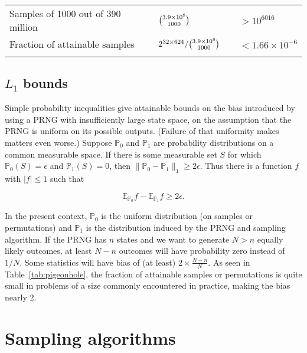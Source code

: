 \documentclass[graybox]{svmult}
\begin{document}
\begin{table}
\begin{tabular}[h]{p{4.7cm}p{2.4cm}p{3.9cm}p{2cm}}
Samples of 1000 out of 390 million & $\tbinom{3.9\times 10^8}{1000}$ & & $> 10^{6016}$ \\
Fraction of attainable samples & ${2^{32 \times 624}}/{\tbinom{3.9\times 10^8}{1000}}$ &  & $< 1.66 \times 10^{-6}$ \\
\noalign{\smallskip}\svhline\noalign{\smallskip}
\end{tabular}
\end{table}

\subsection{$L_1$ bounds}\label{sec:L1bounds}

Simple probability inequalities give attainable bounds on the bias introduced by using a 
PRNG with insufficiently large state space, on  the assumption that the PRNG is uniform on its possible outputs. 
(Failure of that uniformity makes matters even worse.)
Suppose ${\mathbb P}_0$ and ${\mathbb P}_1$ are probability distributions on a common measurable space. 
If there is some measurable set $S$ for which ${\mathbb P}_0(S) = \epsilon$ and ${\mathbb P}_1(S) = 0$, then $\|{\mathbb P}_0 - {\mathbb P}_1 \|_1 \ge 2 \epsilon$.
Thus there is a function $f$ with $|f| \le 1$ such that 

$${\mathbb E}_{{\mathbb P}_0}f -  {\mathbb E}_{{\mathbb P}_1}f \ge 2 \epsilon.$$

In the present context, ${\mathbb P}_0$ is the uniform distribution (on samples or permutations)
and ${\mathbb P}_1$ is the distribution induced by the PRNG and sampling algorithm.
If the PRNG has $n$ states and we want to generate $N>n$ equally likely outcomes, at least $N-n$ outcomes will have probability zero instead of $1/N$.
Some statistics will have bias of (at least) $2 \times \frac{N-n}{N}$.
As seen in Table~\ref{tab:pigeonhole}, the fraction of attainable samples or 
permutations is quite small in problems of a size commonly encountered
in practice, making the bias nearly $2$. 

\section{Sampling algorithms}
\label{sec:algorithms}
\end{document}
